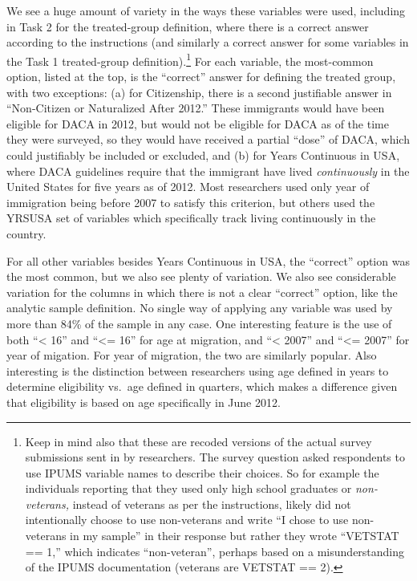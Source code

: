 \documentclass[
  letterpaper,
  DIV=11,
  numbers=noendperiod]{scrartcl}
\begin{document}
We see a huge amount of variety in the ways these variables were used,
including in Task 2 for the treated-group definition, where there is a
correct answer according to the instructions (and similarly a correct
answer for some variables in the Task 1 treated-group
definition).\footnote{Keep in mind also that these are recoded versions
  of the actual survey submissions sent in by researchers. The survey
  question asked respondents to use IPUMS variable names to describe
  their choices. So for example the individuals reporting that they used
  only high school graduates or \emph{non-veterans,} instead of veterans
  as per the instructions, likely did not intentionally choose to use
  non-veterans and write ``I chose to use non-veterans in my sample'' in
  their response but rather they wrote ``VETSTAT == 1,'' which indicates
  ``non-veteran'', perhaps based on a misunderstanding of the IPUMS
  documentation (veterans are VETSTAT == 2).} For each variable, the
most-common option, listed at the top, is the ``correct'' answer for
defining the treated group, with two exceptions: (a) for Citizenship,
there is a second justifiable answer in ``Non-Citizen or Naturalized
After 2012.'' These immigrants would have been eligible for DACA in
2012, but would not be eligible for DACA as of the time they were
surveyed, so they would have received a partial ``dose'' of DACA, which
could justifiably be included or excluded, and (b) for Years Continuous
in USA, where DACA guidelines require that the immigrant have lived
\emph{continuously} in the United States for five years as of 2012. Most
researchers used only year of immigration being before 2007 to satisfy
this criterion, but others used the YRSUSA set of variables which
specifically track living continuously in the country.

For all other variables besides Years Continuous in USA, the ``correct''
option was the most common, but we also see plenty of variation. We also
see considerable variation for the columns in which there is not a clear
``correct'' option, like the analytic sample definition. No single way
of applying any variable was used by more than 84\% of the sample in any
case. One interesting feature is the use of both ``\textless{} 16'' and
``\textless= 16'' for age at migration, and ``\textless{} 2007'' and
``\textless= 2007'' for year of migation. For year of migration, the two
are similarly popular. Also interesting is the distinction between
researchers using age defined in years to determine eligibility vs.~age
defined in quarters, which makes a difference given that eligibility is
based on age specifically in June 2012.
\end{document}
